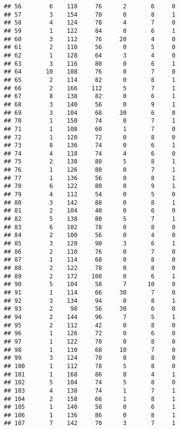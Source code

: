 \documentclass[
]{article}
\begin{document}
\begin{verbatim}
## 56        6    118     76      2       6     0
## 57        3    154     70      0       8     1
## 58        4    124     78      4       7     0
## 59        1    122     84      0       6     1
## 60        3    112     76     20       4     0
## 61        2    110     56      0       5     0
## 62        1    128     64      3       4     0
## 63        3    116     80      0       6     1
## 64       10    108     76      0       7     0
## 65        2    114     82      0       8     1
## 66        2    166    112      5       7     1
## 67        8    138     82      0       6     1
## 68        3    140     56      0       9     1
## 69        3    104     68     30       6     0
## 70        1    150     74      0       7     1
## 71        1    108     60      1       7     0
## 72        1    120     72      0       8     0
## 73        8    136     74      0       6     1
## 74        4    118     74      4       6     0
## 75        2    138     88      5       8     1
## 76        1    126     80      0       7     1
## 77        1    136     56      0       8     1
## 78        6    122     80      0       9     1
## 79        4    112     54      0       5     0
## 80        3    142     88      0       8     1
## 81        2    104     40      0       6     0
## 82        5    138     80      5       7     1
## 83        6    102     78      0       8     0
## 84        2    100     56      0       4     0
## 85        3    120     90      3       6     1
## 86        2    110     76      0       7     0
## 87        1    114     68      0       8     0
## 88        2    122     78      0       8     0
## 89        2    172    108      0       6     1
## 90        5    104     58      7      10     0
## 91        1    114     66     30       7     0
## 92        3    134     94      0       8     1
## 93        2     98     56     30       6     0
## 94        2    144     96      7       5     1
## 95        2    112     42      0       8     0
## 96        1    126     72      0       6     0
## 97        1    122     70      0       8     0
## 98        1    110     68     10       7     0
## 99        3    124     70      0       8     0
## 100       1    112     78      5       8     0
## 101       1    168     86      0       4     1
## 102       5    104     74      5       8     0
## 103       4    138     74      1       7     1
## 104       2    158     66      1       8     1
## 105       1    140     58      0       6     1
## 106       1    136     86      0       8     1
## 107       7    142     70      3       7     1

\end{verbatim}
\end{document}
